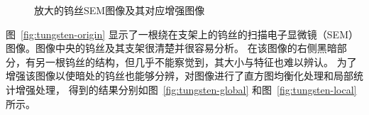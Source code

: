 \documentclass{hitgsrep}
\begin{document}
\begin{figure}[!htb]
    \centering
    \hfill
    \hfill
    \caption{放大的钨丝SEM图像及其对应增强图像}
    \label{fig:tungsten}
\end{figure}

图~\ref{fig:tungsten-origin} 显示了一根绕在支架上的钨丝的扫描电子显微镜（SEM）图像。图像中央的钨丝及其支架很清楚并很容易分析。
在该图像的右侧黑暗部分，有另一根钨丝的结构，但几乎不能察觉到，其大小与特征也难以辨认。
为了增强该图像以使暗处的钨丝也能够分辨，对图像进行了直方图均衡化处理和局部统计增强处理，
得到的结果分别如图~\ref{fig:tungsten-global} 和图~\ref{fig:tungsten-local} 所示。
\end{document}
